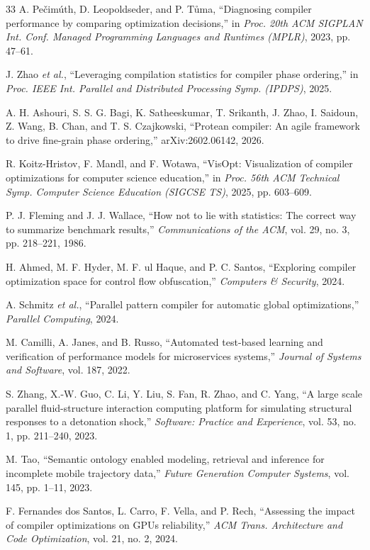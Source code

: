 \documentclass[conference]{IEEEtran}
\begin{document}
\begin{thebibliography}{33}
A. Pe\v{c}im\'{u}th, D. Leopoldseder, and P. T\r{u}ma,
``Diagnosing compiler performance by comparing optimization decisions,''
in \textit{Proc. 20th ACM SIGPLAN Int. Conf. Managed Programming Languages and Runtimes (MPLR)}, 2023, pp. 47--61.

J. Zhao \textit{et al.},
``Leveraging compilation statistics for compiler phase ordering,''
in \textit{Proc. IEEE Int. Parallel and Distributed Processing Symp. (IPDPS)}, 2025.

A. H. Ashouri, S. S. G. Bagi, K. Satheeskumar, T. Srikanth, J. Zhao, I. Saidoun, Z. Wang, B. Chan, and T. S. Czajkowski,
``Protean compiler: An agile framework to drive fine-grain phase ordering,'' arXiv:2602.06142, 2026.

R. Koitz-Hristov, F. Mandl, and F. Wotawa,
``VisOpt: Visualization of compiler optimizations for computer science education,''
in \textit{Proc. 56th ACM Technical Symp. Computer Science Education (SIGCSE TS)}, 2025, pp. 603--609.

P. J. Fleming and J. J. Wallace,
``How not to lie with statistics: The correct way to summarize benchmark results,''
\textit{Communications of the ACM}, vol. 29, no. 3, pp. 218--221, 1986.

H. Ahmed, M. F. Hyder, M. F. ul Haque, and P. C. Santos,
``Exploring compiler optimization space for control flow obfuscation,''
\textit{Computers \& Security}, 2024.

A. Schmitz \textit{et al.},
``Parallel pattern compiler for automatic global optimizations,''
\textit{Parallel Computing}, 2024.

M. Camilli, A. Janes, and B. Russo,
``Automated test-based learning and verification of performance models for microservices systems,''
\textit{Journal of Systems and Software}, vol. 187, 2022.

S. Zhang, X.-W. Guo, C. Li, Y. Liu, S. Fan, R. Zhao, and C. Yang,
``A large scale parallel fluid-structure interaction computing platform for simulating structural responses to a detonation shock,''
\textit{Software: Practice and Experience}, vol. 53, no. 1, pp. 211--240, 2023.

M. Tao,
``Semantic ontology enabled modeling, retrieval and inference for incomplete mobile trajectory data,''
\textit{Future Generation Computer Systems}, vol. 145, pp. 1--11, 2023.

F. Fernandes dos Santos, L. Carro, F. Vella, and P. Rech,
``Assessing the impact of compiler optimizations on GPUs reliability,''
\textit{ACM Trans. Architecture and Code Optimization}, vol. 21, no. 2, 2024.

\end{thebibliography}
\end{document}
